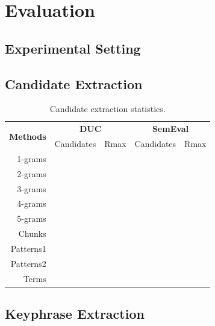 
\section{Evaluation}
\label{sec:evaluation}

  \subsection{Experimental Setting}
  \label{subsec:experimental_setting}

  \subsection{Candidate Extraction}
  \label{subsec:candidate_extraction}

    \begin{table}[h]
      \centering
      \begin{tabular}{@{~}r@{~~}c@{~~}c@{~~}c@{~~}c@{~}}
        \toprule
        \multirow{2}{*}[-2pt]{\textbf{Methods}} & \multicolumn{2}{c}{\textbf{DUC}} & \multicolumn{2}{c}{\textbf{SemEval}}\\
        \cmidrule(r){2-3}\cmidrule{4-5}
        & Candidates & Rmax & Candidates & Rmax\\
        \midrule
        1-grams\\
        2-grams\\
        3-grams\\
        4-grams\\
        5-grams\\
        Chunks\\
        Patterns1\\
        Patterns2\\
        Terms\\
        \bottomrule
      \end{tabular}
      \caption{Candidate extraction statistics.
               \label{tab:candidate_extraction_statistics}}
    \end{table}


  \subsection{Keyphrase Extraction}
  \label{subsec:keyphrase_extraction}

